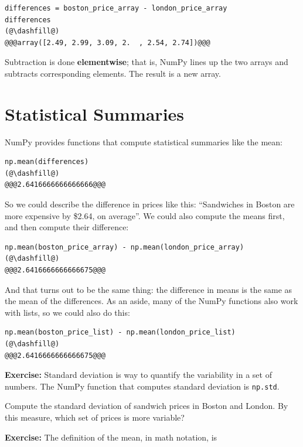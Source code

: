\begin{lstlisting}[]
differences = boston_price_array - london_price_array
differences
(@\dashfill@)
@@@array([2.49, 2.99, 3.09, 2.  , 2.54, 2.74])@@@
\end{lstlisting}

Subtraction is done \textbf{elementwise}; that is, NumPy lines up the
two arrays and subtracts corresponding elements. The result is a new
array.

\hypertarget{statistical-summaries}{%
\section{Statistical Summaries}\label{statistical-summaries}}

NumPy provides functions that compute statistical summaries like the
mean:

\begin{lstlisting}[]
np.mean(differences)
(@\dashfill@)
@@@2.6416666666666666@@@
\end{lstlisting}

So we could describe the difference in prices like this: ``Sandwiches in
Boston are more expensive by \$2.64, on average''. We could also compute
the means first, and then compute their difference:

\begin{lstlisting}[]
np.mean(boston_price_array) - np.mean(london_price_array)
(@\dashfill@)
@@@2.6416666666666675@@@
\end{lstlisting}

And that turns out to be the same thing: the difference in means is the
same as the mean of the differences. As an aside, many of the NumPy
functions also work with lists, so we could also do this:

\begin{lstlisting}[]
np.mean(boston_price_list) - np.mean(london_price_list)
(@\dashfill@)
@@@2.6416666666666675@@@
\end{lstlisting}

\textbf{Exercise:} Standard deviation is way to quantify the variability
in a set of numbers. The NumPy function that computes standard deviation
is \passthrough{\lstinline!np.std!}.

Compute the standard deviation of sandwich prices in Boston and London.
By this measure, which set of prices is more variable?

\textbf{Exercise:} The definition of the mean, in math notation, is


